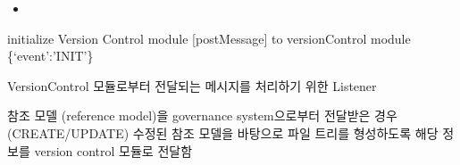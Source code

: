 \documentclass[a4paper,10pt,english]{sphinxmanual}
\begin{document}
\begin{fulllineitems}
\begin{fulllineitems}
\begin{quote}
\begin{description}
\begin{itemize}
\end{itemize}

\end{description}\end{quote}


\nopagebreak

\begin{itemize}
\item {} 
\sphinxAtStartPar
{\hyperref[\detokenize{_SessionManager:SessionManager._dhDaemonListener}]{}}

\end{itemize}



\end{fulllineitems}


\begin{fulllineitems}
\label{\detokenize{_DHDaemon:DHDaemon._vcInit}}
\pysigstartsignatures
{}
\pysigstopsignatures
\sphinxAtStartPar
initialize Version Control module
{[}postMessage{]} to versionControl module \{‘event’:’INIT’\}

\end{fulllineitems}


\begin{fulllineitems}
\label{\detokenize{_DHDaemon:DHDaemon._vcListener}}
\pysigstartsignatures
{}
\pysigstopsignatures
\sphinxAtStartPar
VersionControl 모듈로부터 전달되는 메시지를 처리하기 위한 Listener

\end{fulllineitems}


\begin{fulllineitems}
\label{\detokenize{_DHDaemon:DHDaemon._vcUpdateReferenceModel}}
\pysigstartsignatures
{}
\pysigstopsignatures
\sphinxAtStartPar
참조 모델 (reference model)을 governance system으로부터 전달받은 경우 (CREATE/UPDATE)
수정된 참조 모델을 바탕으로 파일 트리를 형성하도록 해당 정보를 version control 모듈로 전달함
\begin{quote}


\end{quote}
\end{fulllineitems}
\end{fulllineitems}
\end{document}
